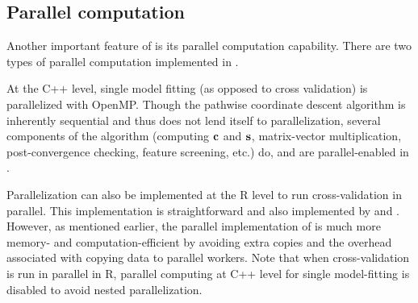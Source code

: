 \subsection{Parallel computation}

Another important feature of  is its parallel computation capability. There are two types of parallel computation implemented in .

At the C++ level, single model fitting (as opposed to cross validation) is parallelized with OpenMP. Though the pathwise coordinate descent algorithm is inherently sequential and thus does not lend itself to parallelization, several components of the algorithm (computing $\mathbf{c}$ and $\mathbf{s}$, matrix-vector multiplication, post-convergence checking, feature screening, etc.) do, and are parallel-enabled in .


Parallelization can also be implemented at the R level to run cross-validation in parallel.  This implementation is straightforward and also implemented by  and .  However, as mentioned earlier, the parallel implementation of  is much more memory- and computation-efficient by avoiding extra copies and the overhead associated with copying data to parallel workers. Note that when cross-validation is run in parallel in R, parallel computing at C++ level for single model-fitting is disabled to avoid nested parallelization.


%

